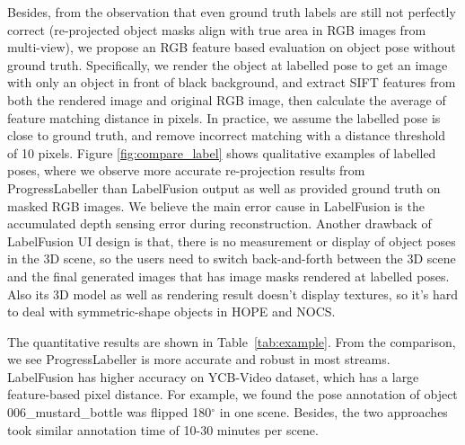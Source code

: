 Besides, from the observation that even ground truth labels are still not perfectly correct (re-projected object masks align with true area in RGB images from multi-view), we propose an RGB feature based evaluation on object pose without ground truth. 
Specifically, we render the object at labelled pose to get an image with only an object in front of black background, and extract SIFT features from both the rendered image and original RGB image, then calculate the average of feature matching distance in pixels. 
In practice, we assume the labelled pose is close to ground truth, and remove incorrect matching with a distance threshold of 10 pixels. Figure \ref{fig:compare_label} shows qualitative examples of labelled poses, where we observe more accurate re-projection results from ProgressLabeller than LabelFusion output as well as provided ground truth on masked RGB images. We believe the main error cause in LabelFusion is the accumulated depth sensing error during reconstruction. Another drawback of LabelFusion UI design is that, there is no measurement or display of object poses in the 3D scene, so the users need to switch back-and-forth between the 3D scene and the final generated images that has image masks rendered at labelled poses. Also its 3D model as well as rendering result doesn't display textures, so it's hard to deal with symmetric-shape objects in HOPE and NOCS. 

The quantitative results are shown in Table~\ref{tab:example}. From the comparison, we see  ProgressLabeller is more accurate and robust in most streams. LabelFusion has higher accuracy on YCB-Video dataset, which has a large feature-based pixel distance. For example, we found the pose annotation of object 006\_mustard\_bottle was flipped 180$^\circ$ in one scene. Besides, the two approaches took similar annotation time of 10-30 minutes per scene.



